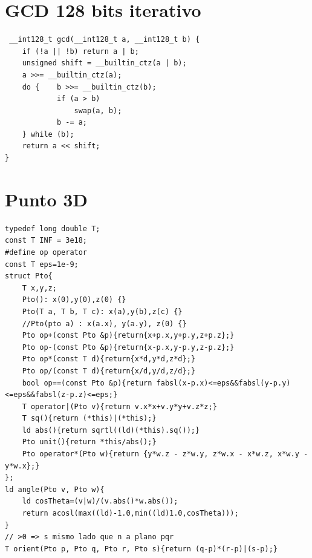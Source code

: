 \documentclass{article}
\begin{document}
\section{GCD 128 bits iterativo}
\begin{lstlisting}
 __int128_t gcd(__int128_t a, __int128_t b) {
    if (!a || !b) return a | b;
    unsigned shift = __builtin_ctz(a | b);
    a >>= __builtin_ctz(a);
    do {	b >>= __builtin_ctz(b);
			if (a > b)
				swap(a, b);
			b -= a;
    } while (b);
    return a << shift;
}
\end{lstlisting}


\section{Punto 3D}
\begin{lstlisting}
typedef long double T;
const T INF = 3e18;
#define op operator
const T eps=1e-9;
struct Pto{
    T x,y,z;
    Pto(): x(0),y(0),z(0) {}
    Pto(T a, T b, T c): x(a),y(b),z(c) {}
    //Pto(pto a) : x(a.x), y(a.y), z(0) {}
    Pto op+(const Pto &p){return{x+p.x,y+p.y,z+p.z};}
    Pto op-(const Pto &p){return{x-p.x,y-p.y,z-p.z};}
    Pto op*(const T d){return{x*d,y*d,z*d};}
    Pto op/(const T d){return{x/d,y/d,z/d};}
    bool op==(const Pto &p){return fabsl(x-p.x)<=eps&&fabsl(y-p.y)<=eps&&fabsl(z-p.z)<=eps;}
    T operator|(Pto v){return v.x*x+v.y*y+v.z*z;}
    T sq(){return (*this)|(*this);}
    ld abs(){return sqrtl((ld)(*this).sq());}
    Pto unit(){return *this/abs();}
    Pto operator*(Pto w){return {y*w.z - z*w.y, z*w.x - x*w.z, x*w.y - y*w.x};}
};
ld angle(Pto v, Pto w){
    ld cosTheta=(v|w)/(v.abs()*w.abs());
    return acosl(max((ld)-1.0,min((ld)1.0,cosTheta)));
}
// >0 => s mismo lado que n a plano pqr
T orient(Pto p, Pto q, Pto r, Pto s){return (q-p)*(r-p)|(s-p);}
\end{lstlisting}
\end{document}
